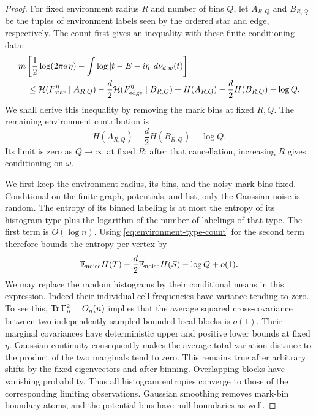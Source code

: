 \begin{proof}
For fixed environment radius \(R\) and number of bins \(Q\), let
\(A_{R,Q}\) and \(B_{R,Q}\) be the tuples of environment labels
seen by the ordered star and edge, respectively.  The count first gives
an inequality with these finite conditioning data:
\begin{align}
 &m\left[\frac12\log(2\pi\mathrm e\,\eta)
        -\int\log|t-E-i\eta|\,d\nu_{d,w}(t)\right]\notag\\
 &\quad\le
 \mathcal H(F^\eta_{\rm star}\mid A_{R,Q})
 -\frac d2\mathcal H(F^\eta_{\rm edge}\mid B_{R,Q})
 +H(A_{R,Q})-\frac d2H(B_{R,Q})-\log Q.
 \label{eq:finite-environment-entropy}
\end{align}
We shall derive this inequality by removing the mark bins at fixed
\(R,Q\).  The remaining environment contribution is
\begin{equation}\label{eq:environment-entropy-remainder}
 H(A_{R,Q})-\frac d2H(B_{R,Q})-\log Q.
\end{equation}
Its limit is zero as \(Q\to\infty\) at fixed \(R\); after that
cancellation, increasing \(R\) gives conditioning on \(\omega\).

We first keep the environment radius, its bins, and the noisy-mark
bins fixed.  Conditional on the finite graph, potentials, and list,
only the Gaussian noise is random.  The entropy of its binned
labeling is at most the entropy of its histogram type plus the
logarithm of the number of labelings of that type.  The first term
is \(O(\log n)\).  Using \eqref{eq:environment-type-count} for the
second term therefore bounds the entropy per vertex by
\[
 \mathbb E_{\rm noise}H(T)-\frac d2\mathbb E_{\rm noise}H(S)-\log Q+o(1).
\]
We may replace the random histograms by their conditional means in
this expression.  Indeed their individual cell frequencies have
variance tending to zero.  To see this, \(\operatorname{Tr}\Gamma_\eta^2=O_\eta(n)\)
implies that the average squared cross-covariance between two
independently sampled bounded local blocks is \(o(1)\).  Their
marginal covariances have deterministic upper and positive lower
bounds at fixed \(\eta\).  Gaussian continuity consequently makes
the average total variation distance to the product of the two
marginals tend to zero.  This remains true after arbitrary shifts
by the fixed eigenvectors and after binning.  Overlapping blocks
have vanishing probability.  Thus all histogram entropies converge
to those of the corresponding limiting observations.  Gaussian
smoothing removes mark-bin boundary atoms, and the potential bins
have null boundaries as well.


\end{proof}
